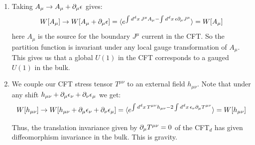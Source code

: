 \documentclass[11pt, class=article, crop=false]{standalone}
\begin{document}
\begin{enumerate}
\begin{enumerate}
		\item \textbf{Massive case} Now again we have:
		\[
		\begin{aligned}
			0 &= \partial_M (\sqrt{-g} F^{MN}) - \sqrt{-g} \frac{m^2}{L^2} A^N\\
			& = \partial_M (\sqrt{-g} g^{MA} g^{NB} \partial_{\small[ A} A_{B\small]}) - \sqrt{-g} \frac{m^2}{L^2} A^N\\
			& = L^{p-2} \partial_{u} \left( \frac{1}{u^{p+2}} u^{4} \partial_u (u^{\Delta-1} A_\mu(\vec x)) \right) - L^{p} m^2 u^{\Delta-p-1} A_\mu + \dots
		\end{aligned}
		\]
		Then this gives a new quadratic equation for $\Delta$:
		\[
			0 = (\Delta - 1) (\Delta - p) - L^2 m^2 \Rightarrow \Delta = \frac{p+1}{2} \pm \sqrt{\frac{(p-1)^2}{4} + m^2 L^2}
		\]
		We see that the massive field picks up an $A_z$ component which cannot be gauged away, as the mass term is not gauge invariant. Because gauge invariance is lost, we see that the corresponding operator in the CFT does not have dimension $d-1$ anymore and no longer gives rise to a conserved current.
		
	\end{enumerate}
	
	\item Taking $A_\mu \to A_\mu + \partial_\mu \epsilon$ gives:
	\[
		W[A_\mu] \to W[A_\mu + \partial_\mu \epsilon] = \braket{e^{\int d^d x\, J^\mu A_\mu - \int d^d x\, \epsilon \partial_\mu J^\mu }} = W[A_\mu]
	\]
	here $A_\mu$ is the source for the boundary $J^\mu$ current in the CFT. So the partition function is invariant under any local gauge transformation of $A_\mu$. This gives us that a global $U(1)$ in the CFT corresponds to a gauged $U(1)$ in the bulk.
	
	\item We couple our CFT stress tensor $T^{\mu \nu}$ to an external field $h_{\mu \nu}$. Note that under any shift $h_{\mu \nu} + \partial_\mu \epsilon_\nu + \partial_\nu \epsilon_\mu$ we get:
	\[
		W[h_{\mu \nu}] \to W[h_{\mu \nu} + \partial_\mu \epsilon_\nu + \partial_\nu \epsilon_\mu] = \braket{e^{\int d^d x\, T^{\mu \nu} h_{\mu \nu}- 2 \int d^d x\, \epsilon_\nu \partial_\mu T^{\mu \nu}}} = W[h_{\mu \nu}]
	\]
	
	Thus, the translation invariance given by $\partial_\mu T^{\mu \nu} = 0$ of the CFT$_d$ has given diffeomorphism invariance in the bulk. This is gravity. 
	

\end{enumerate}
\end{document}
